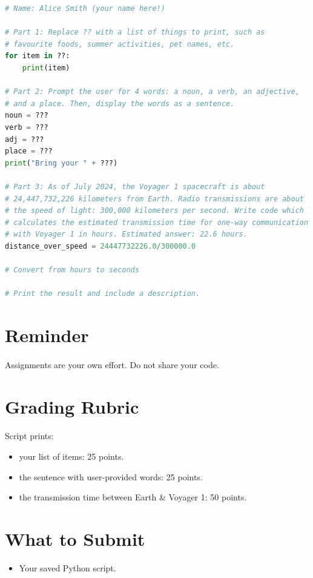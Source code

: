 \documentclass[letter,10pt]{article}
\begin{document}
    \begin{lstlisting}[language=python]
# Name: Alice Smith (your name here!)

# Part 1: Replace ?? with a list of things to print, such as
# favourite foods, summer activities, pet names, etc.
for item in ??:
    print(item)

# Part 2: Prompt the user for 4 words: a noun, a verb, an adjective,
# and a place. Then, display the words as a sentence.
noun = ???
verb = ???
adj = ???
place = ???
print("Bring your " + ???)

# Part 3: As of July 2024, the Voyager 1 spacecraft is about
# 24,447,732,226 kilometers from Earth. Radio transmissions are about
# the speed of light: 300,000 kilometers per second. Write code which
# calculates the estimated transmission time for one-way communication
# with Voyager 1 in hours. Estimated answer: 22.6 hours.
distance_over_speed = 24447732226.0/300000.0

# Convert from hours to seconds

# Print the result and include a description.

    \end{lstlisting}
    
    \section*{Reminder}
    \paragraph{}Assignments are your own effort. Do not share your code.
    
    \section*{Grading Rubric}
    \paragraph{}Script prints:
    \begin{itemize}
        \item your list of items: 25 points.
        \item the sentence with user-provided words: 25 points.
        \item the transmission time between Earth \& Voyager 1: 50 points.
    \end{itemize}
    
    \section*{What to Submit}
    \begin{itemize}
        \item Your saved Python script.
    \end{itemize}
    
\end{document}
